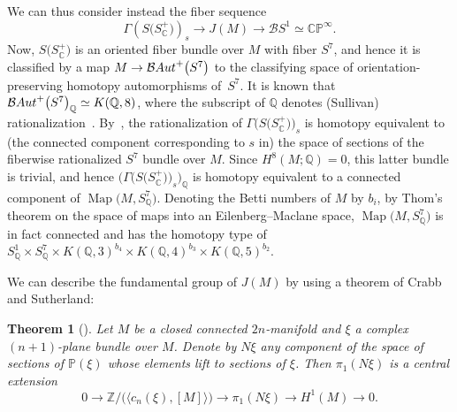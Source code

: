 \documentclass[11pt]{article}
\numberwithin{equation}{section}
\newcommand{\CP}{\mathbb{CP}}
\newcommand{\ZZ}{\mathbb{Z}}
\newcommand{\QQ}{\mathbb{Q}}
\newcommand{\C}{\mathbb{C}}
\DeclareMathOperator{\Map}{Map}
\numberwithin{equation}{section}
\newtheorem{Theorem}{Theorem}[section]
\begin{document}
We can thus consider instead the fiber sequence \begin{equation}\label{fibration2} \Gamma(S\big(S_{\C}^+\big))_s \to J(M) \to {\mathcal B}S ^1 \simeq \CP^\infty. \end{equation} Now, $S\big(S_{\C}^+\big)$ is an oriented fiber bundle over $M$ with fiber $S^7$, and hence it is classified by a map $M \to {\mathcal B}{\rm Aut}^+\big(S^7\big)$ to the classifying space of orientation-preserving homotopy automorphisms of~$S^7$. It is known that ${\mathcal B}{\rm Aut}^+\big(S^7\big)_{\QQ} \simeq K(\QQ, 8)$, where the subscript of $\QQ$ denotes (Sullivan) rationalization~\cite[Section~11]{S77}. By~\cite[Theorem~5.3]{M87}, the rationalization of $\Gamma\big(S\big(S_{\C}^+\big)\big)_s$ is homotopy equivalent to (the connected component corresponding to $s$ in) the space of sections of the fiberwise rationalized $S^7$ bundle over $M$. Since $H^8(M;\QQ) = 0$, this latter bundle is trivial, and hence $\big(\Gamma\big(S\big(S_{\C}^+\big)\big)_s\big)_{\QQ}$ is homotopy equivalent to a connected component of $\Map\big(M, S^7_{\QQ}\big)$. Denoting the Betti numbers of $M$ by $b_i$, by Thom's theorem on the space of maps into an Eilenberg--Maclane space, $\Map\big(M, S^7_{\QQ}\big)$ is in fact connected and has the homotopy type of $S^1_{\QQ} \times S^7_{\QQ} \times K(\QQ, 3)^{b_4} \times K(\QQ, 4)^{b_3} \times K(\QQ,5)^{b_2}$.

We can describe the fundamental group of $J(M)$ by using a theorem of Crabb and Sutherland:

\begin{Theorem}[{\cite[Theorem~2.12(i)]{CS84}}] Let $M$ be a closed connected $2n$-manifold and $\xi$ a complex $(n+1)$-plane bundle over $M$. Denote by $N\xi$ any component of the space of sections of $\mathbb{P}(\xi)$ whose elements lift to sections of $\xi$. Then $\pi_1(N\xi)$ is a central extension \[0 \to \ZZ/\big(\big\langle c_n(\xi), [M] \big\rangle \big) \to \pi_1(N\xi) \to H^1(M) \to 0.\]
\end{Theorem}
\end{document}
